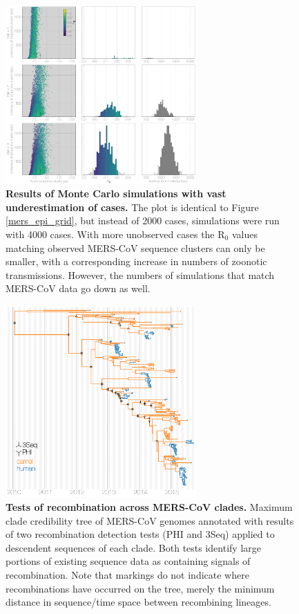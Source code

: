 \documentclass[9pt,lineno]{elife}
\begin{document}
\begin{figure}[h]
\centering
	\includegraphics[width=0.65\textwidth]{figures/mers_epi_4000c.png}
	\caption{\textbf{Results of Monte Carlo simulations with vast underestimation of cases.}
The plot is identical to Figure \ref{mers_epi_grid}, but instead of 2000 cases,
simulations were run with 4000 cases.
With more unobserved cases the R$_{0}$ values matching observed MERS-CoV sequence clusters can only be smaller, with a corresponding increase in numbers of zoonotic transmissions.
However, the numbers of simulations that match MERS-CoV data go down as well.
	}
	\label{extra_cases}
\end{figure}

\begin{figure}[h]
\centering
	\includegraphics[width=0.65\textwidth]{figures/mers_recombination_tree.png}
	\caption{\textbf{Tests of recombination across MERS-CoV clades.}
Maximum clade credibility tree of MERS-CoV genomes annotated with results of two recombination detection tests (PHI and 3Seq) applied to descendent sequences of each clade.
Both tests identify large portions of existing sequence data as containing signals of recombination.
Note that markings do not indicate where recombinations have occurred on the tree, merely the minimum distance in sequence/time space between recombining lineages.}
	\label{recombination_tree}
\end{figure}
\end{document}
